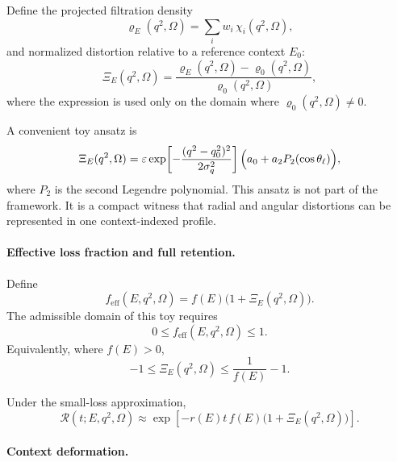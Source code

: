 \documentclass[aps,prx,onecolumn,11pt]{revtex4-2}
\theoremstyle{plain}
\theoremstyle{definition}
\theoremstyle{remark}
\begin{document}
Define the projected filtration density
\begin{equation}
\varrho_E(q^2,\Omega)
=
\sum_i w_i\,\chi_i(q^2,\Omega),
\label{eq:toy_unified_filtration_density}
\end{equation}
and normalized distortion relative to a reference context \(E_0\):
\begin{equation}
\Xi_E(q^2,\Omega)
=
\frac{
\varrho_E(q^2,\Omega)-\varrho_0(q^2,\Omega)
}{
\varrho_0(q^2,\Omega)
},
\label{eq:toy_unified_distortion}
\end{equation}
where the expression is used only on the domain where
\(\varrho_0(q^2,\Omega)\neq 0\).

A convenient toy ansatz is
\begin{equation}
\Xi_E(q^2,\Omega)
=
\varepsilon
\exp\!\left[
-\frac{(q^2-q_0^2)^2}{2\sigma_q^2}
\right]
\Bigl(a_0+a_2P_2(\cos\theta_\ell)\Bigr),
\label{eq:toy_unified_ansatz}
\end{equation}
where \(P_2\) is the second Legendre polynomial. This ansatz is not
part of the framework. It is a compact witness that radial and angular
distortions can be represented in one context-indexed profile.

\paragraph{Effective loss fraction and full retention.}

Define
\begin{equation}
f_{\mathrm{eff}}(E,q^2,\Omega)
=
f(E)\bigl(1+\Xi_E(q^2,\Omega)\bigr).
\label{eq:toy_unified_feff}
\end{equation}
The admissible domain of this toy requires
\begin{equation}
0\leq f_{\mathrm{eff}}(E,q^2,\Omega)\leq 1.
\label{eq:toy_unified_feff_bounds}
\end{equation}
Equivalently, where \(f(E)>0\),
\begin{equation}
-1
\leq
\Xi_E(q^2,\Omega)
\leq
\frac{1}{f(E)}-1.
\label{eq:toy_unified_distortion_bounds}
\end{equation}

Under the small-loss approximation,
\begin{equation}
\mathcal R(t;E,q^2,\Omega)
\approx
\exp\!\left[
-r(E)t\,f(E)\bigl(1+\Xi_E(q^2,\Omega)\bigr)
\right].
\label{eq:toy_unified_retention_full}
\end{equation}

\paragraph{Context deformation.}
\end{document}
